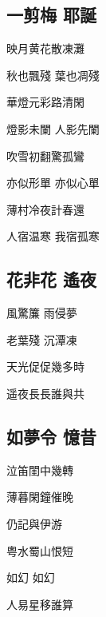 \documentclass[a4j,12pt]{ltjtarticle}
\begin{document}
\begin{center}
	\begin{flushleft}
		\section{一剪梅 耶誕} 
	\end{flushleft}	
	
	
	\vfill
	\LARGE 映月黄花散凍灘 \par
	秋也飄殘  葉也凋殘 \par
	華燈元彩路清閑 \par
	燈影未闌  人影先闌 \par
	吹雪初翻驚孤鸞 \par
	亦似形單 亦似心單 \par
	薄村冷夜計春還 \par
	人宿温寒 我宿孤寒 \par
	
	
	\vspace{2cm} %
	\vfill
	
	
	\newpage
	
	\begin{flushleft}
		\section{花非花 遙夜} 
	\end{flushleft}	
	
	\vfill
	\LARGE 風驚簾    雨侵夢\par
	老葉殘    沉潭凍\par
	天光促促幾多時 \par
	遥夜長長誰與共 \par

	\vspace{0.5cm} %
	\vfill
	
	
	\newpage 
	
	
	\begin{flushleft}
		\section{如夢令 憶昔} 
	\end{flushleft}	
	
	\vfill
	\LARGE 泣笛閨中幾轉\par
	薄暮閑鐘催晚\par
	仍記與伊游\par 
	粤水蜀山恨短 \par
	如幻    如幻\par
	人易星移誰算\par
	\vspace{1.5cm} %
	\vfill
	
	
	
	
	\end{center}
	
\end{document}
